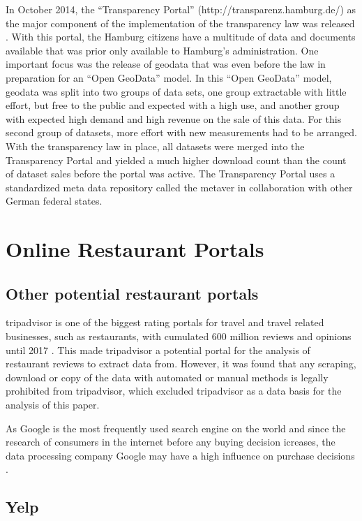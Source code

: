 \documentclass[a4paper, 11pt, oneside]{Thesis}  %
\begin{document}
In October 2014, the ``Transparency Portal'' (http://transparenz.hamburg.de/) as the major component of the implementation of the transparency law was released \cite{Murjahn.2016}. With this portal, the Hamburg citizens have a multitude of data and documents available that was prior only available to Hamburg's administration. One important focus was the release of geodata that was even before the law in preparation for an ``Open GeoData'' model. In this ``Open GeoData'' model, geodata was split into two groups of data sets, one group extractable with little effort, but free to the public and expected with a high use, and another group with expected high demand and high revenue on the sale of this data. For this second group of datasets, more effort with new measurements had to be arranged. With the transparency law in place, all datasets were merged into the Transparency Portal and yielded a much higher download count than the count of dataset sales before the portal was active. The Transparency Portal uses a standardized meta data repository called the \ac{metaver} in collaboration with other German federal states.

\section{Online Restaurant Portals}

\subsection{Other potential restaurant portals}

tripadvisor is one of the biggest rating portals for travel and travel related businesses, such as restaurants, with cumulated 600 million reviews and opinions until 2017 \cite{StephenKaufer.27.04.2018}. This made tripadvisor a potential portal for the analysis of restaurant reviews to extract data from. However, it was found that any scraping, download or copy of the data with automated or manual methods is legally prohibited from tripadvisor, which excluded tripadvisor as a data basis for the analysis of this paper.

As Google is the most frequently used search engine on the world and since the research of consumers in the internet before any buying decision icreases, the data processing company Google may have a high influence on purchase decisions \cite{Zhao.2018} \cite{Shim.2001}.



\subsection{Yelp}
\end{document}
